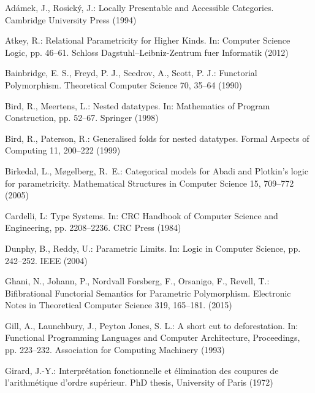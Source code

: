 \documentclass[runningheads]{llncs}
\begin{document}
\begin{thebibliography}{8}


 Ad\'{a}mek, J., Rosick\'{y}, J.: Locally Presentable
  and Accessible Categories.  Cambridge University Press (1994)

 Atkey, R.: Relational Parametricity for Higher Kinds.
  In: Computer Science Logic, pp. 46--61. Schloss
  Dagstuhl--Leibniz-Zentrum fuer Informatik (2012)

 Bainbridge, E. S., Freyd, P. J., Scedrov, A., Scott, P. J.: 
  Functorial Polymorphism. Theoretical Computer Science 70, 35--64 (1990)

 Bird, R., Meertens, L.: Nested datatypes. 
    In: Mathematics of Program Construction, pp. 52--67. Springer (1998)

 Bird, R., Paterson, R.: Generalised folds for nested datatypes. 
  Formal Aspects of Computing 11, 200--222 (1999)

 Birkedal, L., M{\o}gelberg, R.~E.: 
  Categorical models for {A}badi and {P}lotkin's logic for parametricity.
    Mathematical Structures in Computer Science 15, 709--772 (2005)

 Cardelli, L: Type Systems. In: CRC Handbook of
  Computer Science and Engineering, pp. 2208--2236. CRC Press (1984)

 Dunphy, B., Reddy, U.: Parametric Limits.
    In: Logic in Computer Science, pp. 242--252. IEEE (2004)

 Ghani, N., Johann, P., Nordvall Forsberg, F.,
  Orsanigo, F., Revell, T.: Bifibrational Functorial Semantics for
  Parametric Polymorphism.  Electronic Notes in Theoretical Computer
  Science 319, 165--181. (2015)

 Gill, A., Launchbury, J., Peyton Jones, S. L.: A short
  cut to deforestation.  In: Functional Programming Languages and
  Computer Architecture, Proceedings, pp. 223--232. Association for
  Computing Machinery (1993)

 Girard, J.-Y.: Interpr\'etation fonctionnelle et
  \'elimination des coupures de l'arithmétique d'ordre sup\'erieur.
  PhD thesis, University of Paris (1972)
    


\end{thebibliography}
\end{document}
